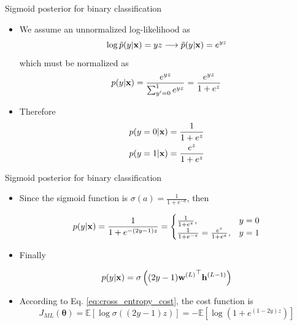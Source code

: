 \documentclass{beamer}
\begin{document}
\begin{frame}{Sigmoid posterior for binary classification}
\begin{itemize}
\item We assume an unnormalized log-likelihood as 
\begin{equation}
\log \tilde{p}(y|{\bf x})=yz \longrightarrow \tilde{p}(y|{\bf x})=e^{yz}
\end{equation}
which must be normalized as 
\begin{equation}
    p(y|{{\bf x}})=\frac{e^{yz}}{\sum_{y'=0}^1 e^{yz}}=\frac{e^{yz}}{1 + e^{z}}
\end{equation}
\item Therefore 
\begin{equation}
    \begin{split}
        p(y=0|{\bf x}) & = \frac{1}{1+e^z}\\
        p(y=1|{\bf x}) & = \frac{e^z}{1+e^z}
    \end{split}
\end{equation}
\end{itemize}
\end{frame}

\begin{frame}{Sigmoid posterior for binary classification}
\begin{itemize}
\item Since the sigmoid function is $\sigma(a)=\frac{1}{1+e^{-a}}$, then 


\begin{equation}
 p(y|{\bf x})=\frac{1}{1+e^{-(2y-1)z}}
 =\begin{cases}
 \frac{1}{1+e^z}, & y=0\\
 \frac{1}{1+e^{-z}}=\frac{e^z}{1+e^{z}}, & y=1\\
 \end{cases}
\end{equation}
\item Finally

\begin{equation}
 p(y|{\bf x})=\sigma\left( (2y-1){{\bf w}^{(L)}}^\top  {\bf h}^{(L-1)} \right)
\end{equation}


\item According to Eq. \eqref{eq:cross_entropy_cost}, the cost function is
\begin{equation}\label{eq:bernoulli_cost_function}
J_{ML}(\boldsymbol \theta)=\mathbb{E}\left[\log \sigma((2y-1)z)\right]=-\mathbb{E}\left[ \log\left(1+e^{(1-2y)z}\right)\right]
\end{equation}
\end{itemize}
\end{frame}
\end{document}
